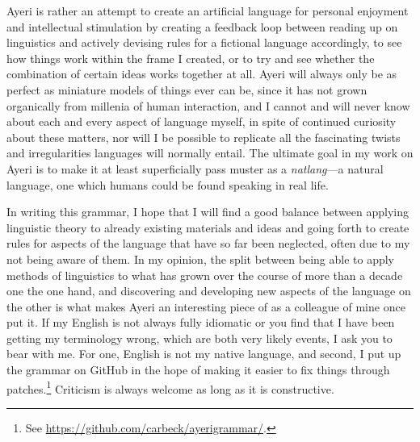 Ayeri is rather an attempt to create an artificial language for personal 
enjoyment and intellectual stimulation by creating a feedback loop between 
reading up on linguistics and actively devising rules for a fictional language 
accordingly, to see how things work within the frame I created, or to try and 
see whether the combination of certain ideas works together at all. Ayeri will 
always only be as perfect as miniature models of things ever can be, since it 
has not grown organically from millenia of human interaction, and I cannot and 
will never know about each and every aspect of language myself, in spite of 
continued curiosity about these matters, nor will I be possible to replicate 
all the fascinating twists and irregularities languages will normally entail. 
The ultimate goal in my work on Ayeri is to make it at least superficially pass 
muster as a \emph{natlang}---a natural language, one which humans could be 
found speaking in real life.

In writing this grammar, I hope that I will find a good balance between 
applying linguistic theory to already existing materials and ideas and going 
forth to create rules for aspects of the language that have so far been 
neglected, often due to my not being aware of them. In my opinion, the split 
between being able to apply methods of linguistics to what has grown over the 
course of more than a decade one the one hand, and discovering and developing 
new aspects of the language on the other is what makes Ayeri an interesting 
piece of  as a colleague of mine once put it.
If my English is not always fully idiomatic or you find that I have been 
getting my terminology wrong, which are both very likely events, I ask you to 
bear with me. For one, English is not my native language, and second, I put up 
the grammar on GitHub in the hope of making it easier to fix things through 
patches.\footnote{See 
\href{https://github.com/carbeck/ayerigrammar}{https://github.com/carbeck/ayerigrammar/}.}
Criticism is always welcome as long as it is constructive.
